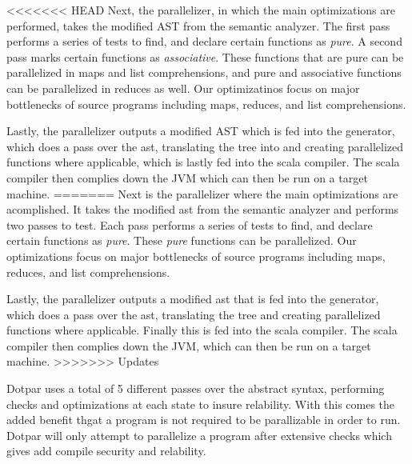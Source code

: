 <<<<<<< HEAD
Next, the parallelizer, in which the main optimizations are performed, takes
the modified AST from the semantic analyzer. The first pass
performs a series of tests to find, and declare certain functions as
\emph{pure}. A second pass marks certain functions as \emph{associative}.
These functions that are pure can be parallelized in maps and list
comprehensions, and pure and associative functions can be parallelized in
reduces as well. Our optimizatinos focus on major bottlenecks of source programs
including maps, reduces, and list comprehensions.

Lastly, the parallelizer outputs a modified AST which is fed into the generator, 
which does a pass over the ast, translating the tree into and creating parallelized 
functions where applicable, which is lastly fed into the scala compiler.  The
scala compiler then complies down the JVM which can then be run on a target machine.
=======
Next is the parallelizer where the main optimizations are acomplished. It takes 
the modified ast from the semantic analyzer and performs two passes to test. 
Each pass performs a series of tests to find, and declare certain functions as \emph{pure}.
These \emph{pure} functions can be parallelized. Our optimizations focus on major
bottlenecks of source programs including maps, reduces, and list comprehensions.

Lastly, the parallelizer outputs a modified ast that is fed into the generator, 
which does a pass over the ast, translating the tree and creating parallelized 
functions where applicable. Finally this is fed into the scala compiler.  The
scala compiler then complies down the JVM, which can then be run on a target machine.
>>>>>>> Updates

Dotpar uses a total of 5 different passes over the abstract syntax, performing 
checks and optimizations at each state to insure relability.  With this comes
the added benefit thgat a program is not required to be parallizable in order to run.  Dotpar
will only attempt to parallelize a program after extensive checks which gives add 
compile security and relability.

